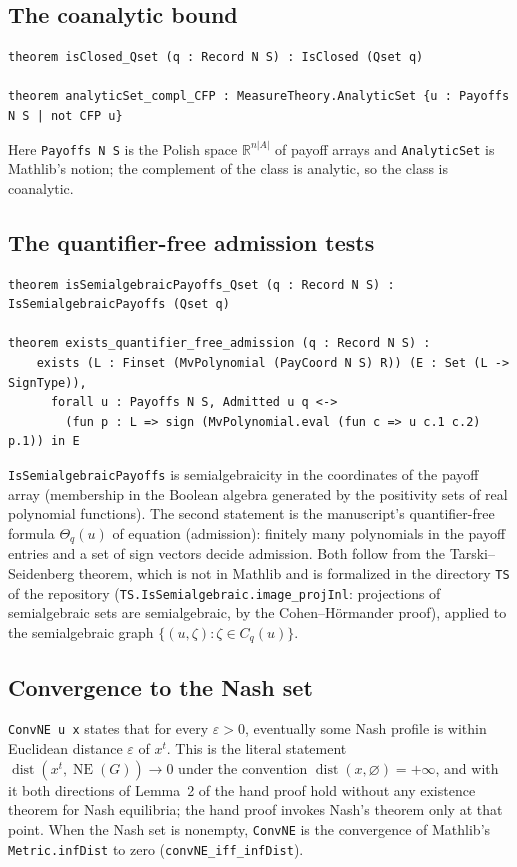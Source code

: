 \documentclass[11pt]{article}
\theoremstyle{definition}
\newcommand{\R}{\mathbb R}
\DeclareMathOperator{\NE}{NE}
\DeclareMathOperator{\dist}{dist}
\begin{document}
\subsection*{The coanalytic bound}
\begin{verbatim}
theorem isClosed_Qset (q : Record N S) : IsClosed (Qset q)

theorem analyticSet_compl_CFP : MeasureTheory.AnalyticSet {u : Payoffs N S | not CFP u}
\end{verbatim}
Here \texttt{Payoffs N S} is the Polish space $\R^{n|A|}$ of payoff arrays and \texttt{AnalyticSet} is Mathlib's notion; the complement of the class is analytic, so the class is coanalytic.

\subsection*{The quantifier-free admission tests}
\begin{verbatim}
theorem isSemialgebraicPayoffs_Qset (q : Record N S) : IsSemialgebraicPayoffs (Qset q)

theorem exists_quantifier_free_admission (q : Record N S) :
    exists (L : Finset (MvPolynomial (PayCoord N S) R)) (E : Set (L -> SignType)),
      forall u : Payoffs N S, Admitted u q <->
        (fun p : L => sign (MvPolynomial.eval (fun c => u c.1 c.2) p.1)) in E
\end{verbatim}
\texttt{IsSemialgebraicPayoffs} is semialgebraicity in the coordinates of the payoff array (membership in the Boolean algebra generated by the positivity sets of real polynomial functions). The second statement is the manuscript's quantifier-free formula $\Theta_q(u)$ of equation (admission): finitely many polynomials in the payoff entries and a set of sign vectors decide admission. Both follow from the Tarski--Seidenberg theorem, which is not in Mathlib and is formalized in the directory \texttt{TS} of the repository (\texttt{TS.IsSemialgebraic.image\_projInl}: projections of semialgebraic sets are semialgebraic, by the Cohen--H\"ormander proof), applied to the semialgebraic graph $\{(u,\zeta):\zeta\in C_q(u)\}$.

\subsection*{Convergence to the Nash set}
\texttt{ConvNE u x} states that for every $\varepsilon>0$, eventually some Nash profile is within Euclidean distance $\varepsilon$ of $x^t$. This is the literal statement $\dist(x^t,\NE(G))\to0$ under the convention $\dist(x,\varnothing)=+\infty$, and with it both directions of Lemma~2 of the hand proof hold without any existence theorem for Nash equilibria; the hand proof invokes Nash's theorem only at that point. When the Nash set is nonempty, \texttt{ConvNE} is the convergence of Mathlib's \texttt{Metric.infDist} to zero (\texttt{convNE\_iff\_infDist}).
\end{document}
